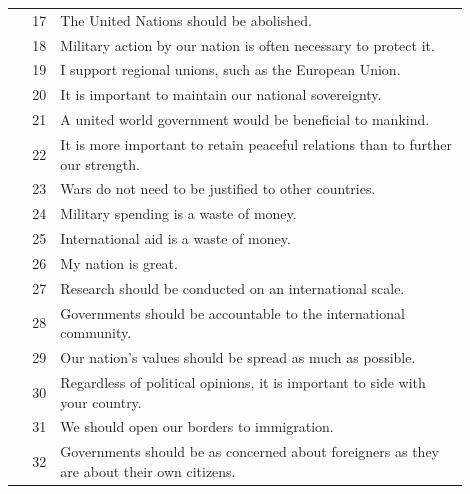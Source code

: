 \documentclass[11pt]{article}
\begin{document}
\begin{longtable}{r p{0.9\linewidth}}
\rowcolor{evDipl} 17 & The United Nations should be abolished. \\
\rowcolor{evDipl} 18 & Military action by our nation is often necessary to protect it. \\
\rowcolor{evDipl} 19 & I support regional unions, such as the European Union. \\
\rowcolor{evDipl} 20 & It is important to maintain our national sovereignty. \\
\rowcolor{evDipl} 21 & A united world government would be beneficial to mankind. \\
\rowcolor{evDipl} 22 & It is more important to retain peaceful relations than to further our strength. \\
\rowcolor{evDipl} 23 & Wars do not need to be justified to other countries. \\
\rowcolor{evDipl} 24 & Military spending is a waste of money. \\
\rowcolor{evDipl} 25 & International aid is a waste of money. \\
\rowcolor{evDipl} 26 & My nation is great. \\
\rowcolor{evDipl} 27 & Research should be conducted on an international scale. \\
\rowcolor{evDipl} 28 & Governments should be accountable to the international community. \\
\rowcolor{evDipl} 29 & Our nation's values should be spread as much as possible. \\
\rowcolor{evDipl} 30 & Regardless of political opinions, it is important to side with your country. \\
\rowcolor{evDipl} 31 & We should open our borders to immigration. \\
\rowcolor{evDipl} 32 & Governments should be as concerned about foreigners as they are about their own citizens. \\


\end{longtable}
\end{document}
